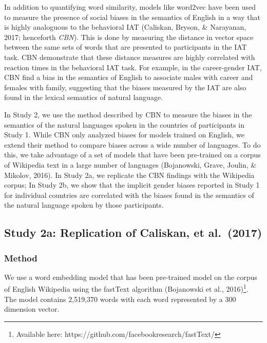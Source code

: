 \documentclass[10pt, letterpaper]{article}
\begin{document}
In addition to quantifying word similarity, models like word2vec have
been used to measure the presence of social biases in the semantics of
English in a way that is highly analoguous to the behavioral IAT
(Caliskan, Bryson, \& Narayanan, 2017; henceforth \emph{CBN}). This is
done by measuring the distance in vector space between the same sets of
words that are presented to participants in the IAT task. CBN
demonstrate that these distance measures are highly correlated with
reaction times in the behavioral IAT task. For example, in the
career-gender IAT, CBN find a bias in the semantics of English to
associate males with career and females with family, suggesting that the
biases measured by the IAT are also found in the lexical semantics of
natural language.

In Study 2, we use the method described by CBN to measure the biases in
the semantics of the natural languages spoken in the countries of
participants in Study 1. While CBN only analyzed biases for models
trained on English, we extend their method to compare biases across a
wide number of languages. To do this, we take advantage of a set of
models that have been pre-trained on a corpus of Wikipedia text in a
large number of languages (Bojanowski, Grave, Joulin, \& Mikolov, 2016).
In Study 2a, we replicate the CBN findings with the Wikipedia corpus; In
Study 2b, we show that the implicit gender biases reported in Study 1
for individual countries are correlated with the biases found in the
semantics of the natural language spoken by those participants.

\subsection{Study 2a: Replication of Caliskan, et
al.~(2017)}\label{study-2a-replication-of-caliskan-et-al.2017}

\subsubsection{Method}\label{method-1}

We use a word embedding model that has been pre-trained model on the
corpus of English Wikipedia using the fastText algorithm (Bojanowski et
al.,
2016)\footnote{Available here: https://github.com/facebookresearch/fastText/}.
The model contains 2,519,370 words with each word represented by a 300
dimension vector.
\end{document}
